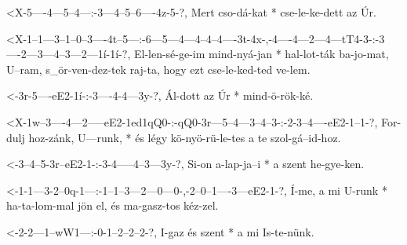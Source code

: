   {<X-5----4---5--4---:-3---4--5--6----4z-5-?,}
  {   Mert cso-dá-kat * cse-le-ke-dett az Úr.}




  {<X-1--1---3--1--0--3----4t--5---:-6---5---4---4--4--4----3t-4x-,-4----4---2---4---tT4-3-:-3----2---3---4--3---2---1í-1í-?,}
  {   El-len-sé-ge-im mind-nyá-jan * hal-lot-ták ba-jo-mat, U--ram, s_ör-ven-dez-tek raj-ta, hogy ezt cse-le-ked-ted ve-lem.}

  {<-3r-5----eE2-1í-:-3----4-4---3y-?,}
  {  Ál-dott az  Úr * mind-ö-rök-ké.}

  {<X-1w--3----4---2-----eE2-1ed1qQ0-:-qQ0-3r---5--4---3--4--3-:-2-3--4----eE2-1--1-?,}
  {   For-dulj hoz-zánk, U---runk,   * és  légy kö-nyö-rü-le-tes a te szol-gá--id-hoz.}



  {<-3--4--5-3r--eE2-1-:-3-4-----4--3---3y-?,}
  {  Si-on a-lap-ja--i * a szent he-gye-ken.}

  {<-1-1---3-2--0q-1---:-1--1--3---2---0---0-,-2--0--1----3---eE2-1-?,}
  {  Í-me, a mi U-runk * ha-ta-lom-mal jön el, és ma-gasz-tos kéz-zel.}


  {<-2-2---1--wW1---:-0-1--2--2--2-?,}
  {  I-gaz és szent * a mi Is-te-nünk.}



